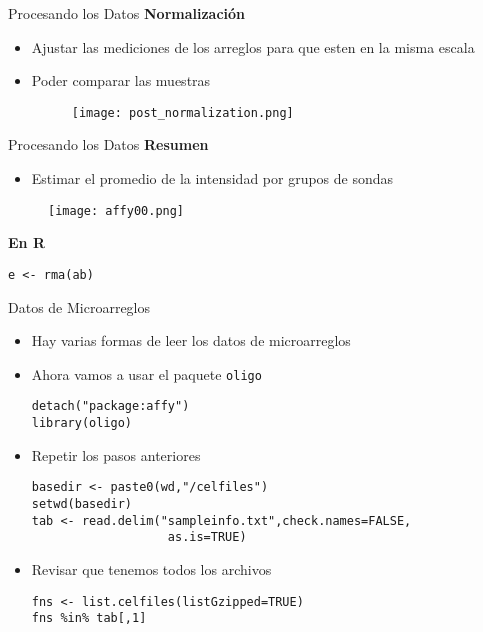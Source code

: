 \documentclass{beamer}
\begin{document}
\begin{frame}[fragile]{Procesando los Datos}
\textbf{Normalización}
\begin{itemize}
\item Ajustar las mediciones de los arreglos para que esten en la misma escala
\item Poder comparar las muestras
\begin{figure}[H]
\centering
\texttt{[image: post\_normalization.png]}
\end{figure}
\end{itemize}

\end{frame}

\begin{frame}[fragile]{Procesando los Datos}
\textbf{Resumen}
\begin{itemize}
\item Estimar el promedio de la intensidad por grupos de sondas
\end{itemize}
\begin{figure}[H]
\centering
\texttt{[image: affy00.png]}
\end{figure}

\textbf{En R}
\begin{verbatim}
e <- rma(ab)
\end{verbatim}
\end{frame}

\begin{frame}[fragile]{Datos de Microarreglos}
\begin{itemize}
\item Hay varias formas de leer los datos de microarreglos
\item Ahora vamos a usar el paquete \verb=oligo=
\begin{verbatim}
detach("package:affy")
library(oligo)
\end{verbatim}
\item Repetir los pasos anteriores
\begin{verbatim}
basedir <- paste0(wd,"/celfiles")
setwd(basedir)
tab <- read.delim("sampleinfo.txt",check.names=FALSE,
				   as.is=TRUE)
\end{verbatim}
\item Revisar que tenemos todos los archivos
\begin{verbatim}
fns <- list.celfiles(listGzipped=TRUE)
fns %in% tab[,1]
\end{verbatim}
\end{itemize}
\end{frame}
\end{document}
